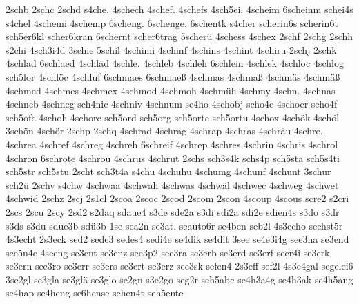 {    2schb
    2schc
    2schd
    s4che.
    4schech
    4schef.
    4schefs
    4sch5ei.
    4scheim
    6scheinm
    schei4s
    s4chel
    4schemi
    4schemp
    6scheng.
    6schenge.
    6schentk
    s4cher
    scherin6s
    scherin6t
    sch5er6kl
    scher6kran
    6schernt
    scher6trag
    5scherü
    4schess
    4schex
    2schf
    2schg
    2schh
    s2chi
    4sch3i4d
    3schie
    5schil
    4schimi
    4schinf
    4schins
    4schint
    4schiru
    2schj
    2schk
    4schlad
    6schlaed
    4schläd
    4schle.
    4schleb
    4schleh
    6schlein
    4schlek
    4schloc
    4schlog
    sch5lor
    4schlöc
    4schluf
    6schmaes
    6schmaeß
    4schmas
    4schmaß
    4schmäs
    4schmäß
    4schmed
    4schmes
    4schmex
    4schmod
    4schmoh
    4schmüh
    4schmy
    4schn.
    4schnas
    4schneb
    4schneg
    sch4nic
    4schniv
    4schnum
    sc4ho
    4schobj
    scho4e
    4schoer
    scho4f
    sch5ofe
    4schoh
    4schorc
    sch5ord
    sch5org
    sch5orte
    sch5ortu
    4schox
    4schök
    4schöl
    3schön
    4schör
    2schp
    2schq
    4schrad
    4schrag
    4schrap
    4schras
    4schräu
    4schre.
    4schrea
    4schref
    4schreg
    4schreh
    6schreif
    4schrep
    4schres
    4schrin
    4schris
    4schrol
    4schron
    6schrote
    4schrou
    4schrus
    4schrut
    2schs
    sch3s4k
    schs4p
    sch5sta
    sch5s4ti
    sch5str
    sch5stu
    2scht
    sch3t4a
    s4chu
    4schuhu
    4schumg
    4schunf
    4schunt
    3schur
    sch2ü
    2schv
    s4chw
    4schwaa
    4schwah
    4schwas
    4schwäl
    4schwec
    4schweg
    4schwet
    4schwid
    2schz
    2scj
    2s1cl
    2scoa
    2scoc
    2scod
    2scom
    2scon
    4scoup
    4scous
    scre2
    s2cri
    2scs
    2scu
    2scy
    2sd2
    s2daq
    sdaue4
    s3de
    sde2a
    s3di
    sdi2a
    sdi2e
    sdien4s
    s3do
    s3dr
    s3ds
    s3du
    sdue3b
    sdü3b
    1se
    sea2n
    se3at.
    seauto6r
    se4ben
    seb2l
    4s3echo
    sechst5r
    4s3echt
    2s3eck
    sed2
    sede3
    sedes4
    sedi4e
    se4dik
    se4dit
    3see
    se4e3i4g
    see3na
    se3end
    see5n4e
    4seeng
    se3ent
    se3enz
    see3p2
    see3ra
    se3erb
    se3erd
    se3erf
    seer4i
    se3erk
    se3ern
    see3ro
    se3err
    se3ers
    se3ert
    se3erz
    see3sk
    sefen4
    2s3eff
    sef2l
    4s3e4gal
    segelei6
    3se2gl
    se3gla
    se3glä
    se3glo
    se2gn
    s3e2go
    seg2r
    seh5abe
    se4h3a4g
    se4h3ak
    se4h5ang
    se4hap
    se4heng
    se6hense
    sehen4t
    seh5ente
}
